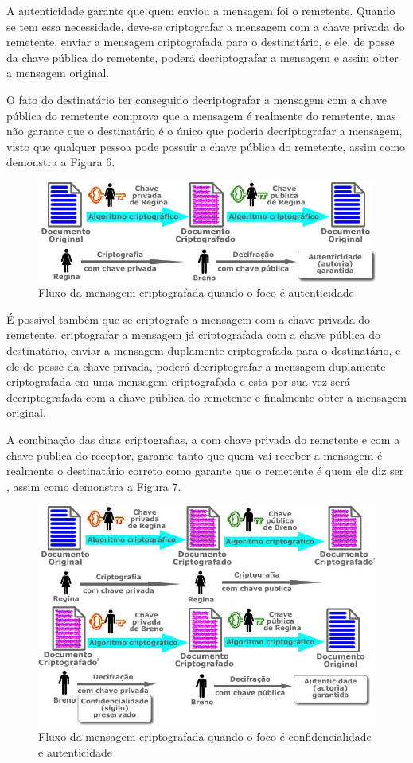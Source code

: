 A autenticidade garante que quem enviou a mensagem foi o remetente. Quando se tem essa necessidade, deve-se criptografar a mensagem com a chave privada do remetente, enviar a mensagem criptografada para o destinatário, e ele, de posse da chave pública do remetente, poderá decriptografar a mensagem e assim obter a mensagem original.

O fato do destinatário ter conseguido decriptografar a mensagem com a chave pública do remetente comprova que a mensagem é realmente do remetente, mas não garante que o destinatário é o único que poderia decriptografar a mensagem, visto que qualquer pessoa pode possuir a chave pública do remetente, assim como demonstra a Figura 6.

\begin{figure}[H]
    \centering
    \caption{Fluxo da mensagem criptografada quando o foco é autenticidade}
    \includegraphics[width=.8\linewidth]{Figuras/Autencidade.png}
\end{figure}

É possível também que se criptografe a mensagem com a chave privada do remetente, criptografar a mensagem já criptografada com a chave pública do destinatário, enviar a mensagem duplamente criptografada para o destinatário, e ele de posse da chave privada, poderá decriptografar a mensagem duplamente criptografada em uma mensagem criptografada e esta por sua vez será decriptografada com a chave pública do remetente e finalmente obter a mensagem original.

A combinação das duas criptografias, a com chave privada do remetente e com a chave publica do receptor, garante tanto que quem vai receber a mensagem é realmente o destinatário correto como garante que o remetente é quem ele diz ser \cite{stallings14}, assim como demonstra a Figura 7.

\begin{figure}[H]
    \centering
    \caption{Fluxo da mensagem criptografada quando o foco é confidencialidade e autenticidade}
    \includegraphics[width=.8\linewidth]{Figuras/ConfidEAuten.png}
\end{figure}

